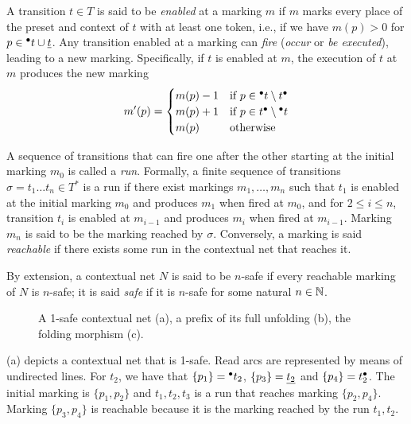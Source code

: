\documentclass[11pt,a4paper]{article}
\begin{document}
A transition $t \in T$ is said to be \emph{enabled} at a marking $m$ if $m$
marks every place of the preset and context of $t$ with at least one token,
i.e.,  if we have $m(p) > 0$ for $p \in {}^\bullet t \cup \underline{t}$.  Any transition
enabled at a marking can \emph{fire} (\emph{occur} or \emph{be executed}),
leading to a new marking.  Specifically, if $t$ is enabled at $m$, the
execution of $t$ at $m$ produces the new marking $$m'(p) = 
\begin{cases}
m(p) - 1 & \mbox{if } p \in {}^\bullet t \setminus t^\bullet \\
m(p) + 1 & \mbox{if } p \in t^\bullet \setminus {}^\bullet t \\
m(p) & \mbox{otherwise}
\end{cases}$$

A sequence of transitions that can fire one after the other starting at the
initial marking $m_0$ is called a \emph{run}.  Formally, a finite sequence of
transitions $\sigma = t_1 \ldots t_n \in T^*$ is a run if there exist markings
$m_1, \ldots, m_n$ such that $t_1$ is enabled at the initial marking $m_0$ and
produces $m_1$ when fired at $m_0$, and for $2 \le i \le n$, transition $t_i$
is enabled at $m_{i-1}$ and produces $m_i$ when fired at $m_{i-1}$.  Marking
$m_n$ is said to be the marking reached by $\sigma$.  Conversely, a marking is
said \emph{reachable} if there exists some run in the contextual net that
reaches it.  

By extension, a contextual net $N$ is said to be $n$-safe if every reachable
marking of $N$ is $n$-safe; it is said \emph{safe} if it is $n$-safe for some
natural $n \in \mathbb{N}$.

\begin{figure}
\caption{A 1-safe contextual net (a), a prefix of its full unfolding (b), the
folding morphism (c).}
\label{fig:a.1safe}
\end{figure}

 (a) depicts a contextual net that is 1-safe.  Read arcs are
represented by means of undirected lines.  For $t_2$, we have that $\{p_1\} =
{}^\bullet t_2$, $\{p_3\} = \underline{t_2}$ and $\{p_4\} = t_2^\bullet$.  The initial
marking is $\{p_1, p_2\}$ and $t_1, t_2, t_3$ is a run that reaches marking
$\{p_2, p_4\}$.  Marking $\{p_3, p_4\}$ is reachable because it is the marking
reached by the run $t_1, t_2$.

\end{document}
